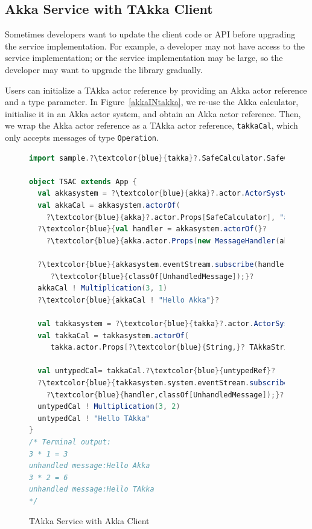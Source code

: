 \subsection{Akka Service with TAkka Client}

Sometimes developers want to update the client code or API before 
upgrading the service implementation. For example, a developer may not have access to 
the service implementation; or the service implementation may be large, so the 
developer may want to upgrade the library gradually.

Users can initialize a TAkka actor reference by providing an Akka actor 
reference and a type parameter.  In Figure~\ref{akkaINtakka}, we re-use the 
Akka calculator, initialise it in an Akka actor system, and obtain an Akka 
actor reference.  Then, we wrap the Akka actor reference as a TAkka 
actor reference, {\tt takkaCal}, which only accepts messages of type
{\tt Operation}.

\begin{figure}[t]

      \begin{lstlisting}[language=scala, escapechar=?]
import sample.?\textcolor{blue}{takka}?.SafeCalculator.SafeCalculator      
      
object TSAC extends App {
  val akkasystem = ?\textcolor{blue}{akka}?.actor.ActorSystem("AkkaSystem")
  val akkaCal = akkasystem.actorOf(
    ?\textcolor{blue}{akka}?.actor.Props[SafeCalculator], "acal")
  ?\textcolor{blue}{val handler = akkasystem.actorOf(}?
    ?\textcolor{blue}{akka.actor.Props(new MessageHandler(akkasystem)))}?
  
  ?\textcolor{blue}{akkasystem.eventStream.subscribe(handler,}?
     ?\textcolor{blue}{classOf[UnhandledMessage]);}?
  akkaCal ! Multiplication(3, 1)     
  ?\textcolor{blue}{akkaCal ! "Hello Akka"}?
  
  val takkasystem = ?\textcolor{blue}{takka}?.actor.ActorSystem("TAkkaSystem")
  val takkaCal = takkasystem.actorOf(
     takka.actor.Props[?\textcolor{blue}{String,}? TAkkaStringActor], "tcal")
  
  val untypedCal= takkaCal.?\textcolor{blue}{untypedRef}?  
  ?\textcolor{blue}{takkasystem.system.eventStream.subscribe(}?
    ?\textcolor{blue}{handler,classOf[UnhandledMessage]);}?  
  untypedCal ! Multiplication(3, 2)     
  untypedCal ! "Hello TAkka"
}
/* Terminal output:
3 * 1 = 3
unhandled message:Hello Akka
3 * 2 = 6
unhandled message:Hello TAkka
*/
    \end{lstlisting}
    \caption{TAkka Service with Akka Client}
\label{takkaINakka}    
\vspace{-15pt }
\end{figure}


